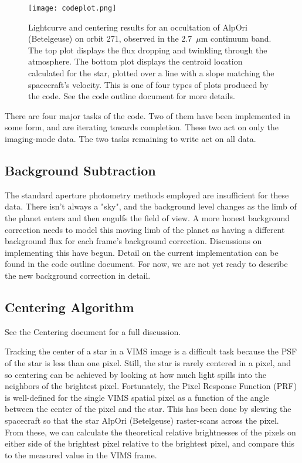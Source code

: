 \documentclass[12pt]{article}
\begin{document}
\begin{figure}[h!]
  \centering
  \texttt{[image: codeplot.png]}
  \caption{Lightcurve and centering results for an occultation of AlpOri
(Betelgeuse) on orbit 271, observed in the 2.7~$\mu$m continuum band. The top
plot displays the flux dropping and twinkling through the atmosphere. The
bottom plot displays the centroid location calculated for the star, plotted
over a line with a slope matching the spacecraft's velocity. This is one of
four types of plots produced by the code. See the code outline document for
more details.}
  \label{fig:codeplots}
\end{figure}

There are four major tasks of the code. Two of them have been implemented in
some form, and are iterating towards completion. These two act on only the
imaging-mode data. The two tasks remaining to write act on all data.

\subsection{Background Subtraction}

The standard aperture photometry methods employed are insufficient for these
data. There isn't always a "sky", and the background level changes as the limb
of the planet enters and then engulfs the field of view.  A more honest
background correction needs to model this moving limb of the planet as having a
different background flux for each frame's background correction. Discussions
on implementing this have begun. Detail on the current implementation can be
found in the code outline document. For now, we are not yet ready to describe
the new background correction in detail.

\subsection{Centering Algorithm}

See the Centering document for a full discussion.

Tracking the center of a star in a VIMS image is a difficult task because the
PSF of the star is less than one pixel. Still, the star is rarely centered in a
pixel, and so centering can be achieved by looking at how much light spills
into the neighbors of the brightest pixel. Fortunately, the Pixel Response
Function (PRF) is well-defined for the single VIMS spatial pixel as a function
of the angle between the center of the pixel and the star. This has been done
by slewing the spacecraft so that the star AlpOri (Betelgeuse) raster-scans
across the pixel. From these, we can calculate the theoretical relative
brightnesses of the pixels on either side of the brightest pixel relative to
the brightest pixel, and compare this to the measured value in the VIMS frame.
\end{document}
